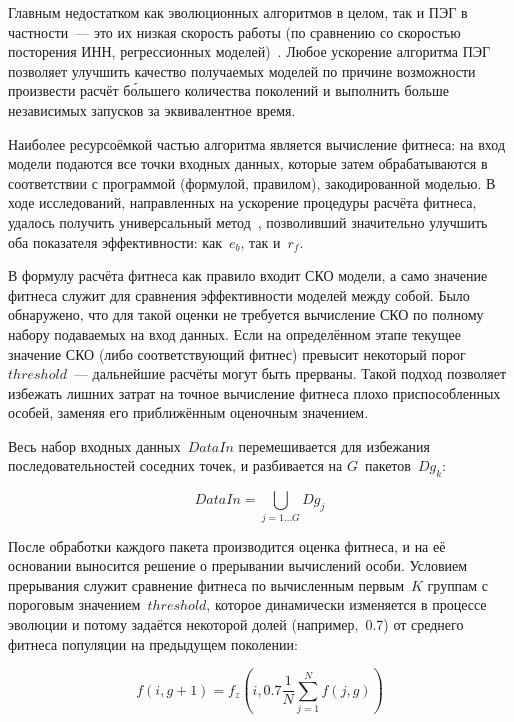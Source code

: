 Главным недостатком как эволюционных алгоритмов в целом, так и ПЭГ в частности~--- это их низкая скорость работы (по сравнению со скоростью посторения ИНН, регрессионных моделей)~\cite{ferreira:2001:wsc6Aa}. Любое ускорение алгоритма ПЭГ позволяет улучшить качество получаемых моделей по причине возможности произвести расчёт б\'{о}льшего количества поколений и выполнить больше независимых запусков за эквивалентное время.

Наиболее ресурсоёмкой частью алгоритма является вычисление фитнеса: на вход модели подаются все точки входных данных, которые затем обрабатываются в соответствии с программой (формулой, правилом), закодированной моделью. В ходе исследований, направленных на ускорение процедуры расчёта фитнеса, удалось получить универсальный метод~\cite{SergMir_11_2013_info_problem}, позволивший значительно улучшить оба показателя эффективности: как~$e_{b}$, так и~$r_{f}$.

В формулу расчёта фитнеса как правило входит СКО модели, а само значение фитнеса служит для сравнения эффективности моделей между собой. Было обнаружено, что для такой оценки не требуется вычисление СКО по полному набору подаваемых на вход данных. Если на определённом этапе текущее значение СКО (либо соответствующий фитнес) превысит некоторый порог~$threshold$~--- дальнейшие расчёты могут быть прерваны. Такой подход позволяет избежать лишних затрат на точное вычисление фитнеса плохо приспособленных особей, заменяя его приближённым оценочным значением.

Весь набор входных данных~$DataIn$ перемешивается для избежания последовательностей соседних точек, и разбивается на $G$~пакетов~$Dg_{k}$:

\begin{equation}
\label{eq:zerg_partial_mse_groups}
DataIn=\bigcup_{j=1\ldots G}{Dg_{j}}
\end{equation}

После обработки каждого пакета производится оценка фитнеса, и на её основании выносится решение о прерывании вычислений особи. Условием прерывания служит сравнение фитнеса по вычисленным первым~$K$ группам с пороговым значением~$threshold$, которое динамически изменяется в процессе эволюции и потому задаётся некоторой долей (например,~0.7) от среднего фитнеса популяции на предыдущем поколении:

\begin{equation}
\label{eq:zerg_partial_mse_fit_form}
f(i, g + 1) = f_{z}(i, 0.7 \frac{1}{N}\sum\limits_{j=1}^{N}{f(j,g)})
\end{equation}

